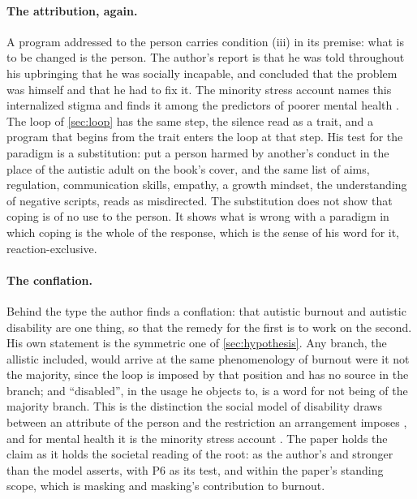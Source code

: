\paragraph{The attribution, again.} A program addressed to the person carries condition (iii) in its premise: what is to be changed is the person. The author's report is that he was told throughout his upbringing that he was socially incapable, and concluded that the problem was himself and that he had to fix it. The minority stress account names this internalized stigma and finds it among the predictors of poorer mental health \cite{Botha2020}. The loop of \autoref{sec:loop} has the same step, the silence read as a trait, and a program that begins from the trait enters the loop at that step. His test for the paradigm is a substitution: put a person harmed by another's conduct in the place of the autistic adult on the book's cover, and the same list of aims, regulation, communication skills, empathy, a growth mindset, the understanding of negative scripts, reads as misdirected. The substitution does not show that coping is of no use to the person. It shows what is wrong with a paradigm in which coping is the whole of the response, which is the sense of his word for it, reaction-exclusive.

\paragraph{The conflation.} Behind the type the author finds a conflation: that autistic burnout and autistic disability are one thing, so that the remedy for the first is to work on the second. His own statement is the symmetric one of \autoref{sec:hypothesis}. Any branch, the allistic included, would arrive at the same phenomenology of burnout were it not the majority, since the loop is imposed by that position and has no source in the branch; and ``disabled'', in the usage he objects to, is a word for not being of the majority branch. This is the distinction the social model of disability draws between an attribute of the person and the restriction an arrangement imposes \cite{Oliver1990}, and for mental health it is the minority stress account \cite{Botha2020}. The paper holds the claim as it holds the societal reading of the root: as the author's and stronger than the model asserts, with P6 as its test, and within the paper's standing scope, which is masking and masking's contribution to burnout.

